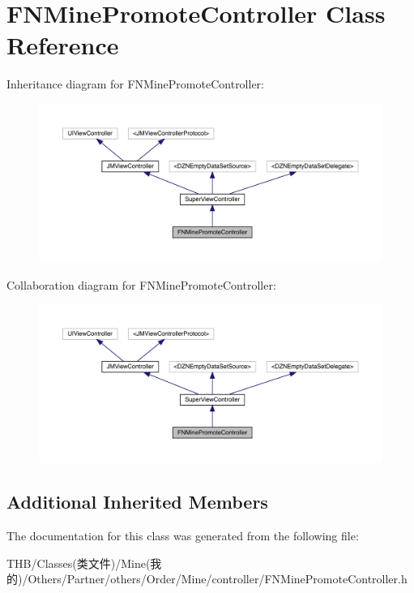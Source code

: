 \hypertarget{interface_f_n_mine_promote_controller}{}\section{F\+N\+Mine\+Promote\+Controller Class Reference}
\label{interface_f_n_mine_promote_controller}


Inheritance diagram for F\+N\+Mine\+Promote\+Controller\+:\nopagebreak
\begin{figure}[H]
\begin{center}
\leavevmode
\includegraphics[width=350pt]{interface_f_n_mine_promote_controller__inherit__graph}
\end{center}
\end{figure}


Collaboration diagram for F\+N\+Mine\+Promote\+Controller\+:\nopagebreak
\begin{figure}[H]
\begin{center}
\leavevmode
\includegraphics[width=350pt]{interface_f_n_mine_promote_controller__coll__graph}
\end{center}
\end{figure}
\subsection*{Additional Inherited Members}


The documentation for this class was generated from the following file\+:\begin{DoxyCompactItemize}
\item 
T\+H\+B/\+Classes(类文件)/\+Mine(我的)/\+Others/\+Partner/others/\+Order/\+Mine/controller/F\+N\+Mine\+Promote\+Controller.\+h\end{DoxyCompactItemize}
